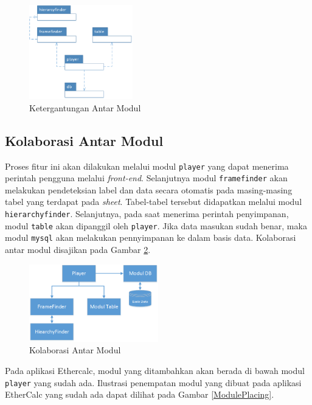 \begin{figure}[htb]
	\centering
	\includegraphics[width=0.4\textwidth]{resources/chapter-4-module-dependecy.png}
	\caption{Ketergantungan Antar Modul}
	\label{ModuleDependency}
\end{figure}

\subsection{Kolaborasi Antar Modul}
Proses fitur ini akan dilakukan melalui modul \texttt{player} yang dapat menerima perintah pengguna melalui \textit{front-end}. Selanjutnya modul \texttt{framefinder} akan melakukan pendeteksian label dan data secara otomatis pada masing-masing tabel yang terdapat pada \textit{sheet}. Tabel-tabel tersebut didapatkan melalui modul \texttt{hierarchyfinder}. Selanjutnya, pada saat menerima perintah penyimpanan, modul \texttt{table} akan dipanggil oleh \texttt{player}. Jika data masukan sudah benar, maka modul \texttt{mysql} akan melakukan pennyimpanan ke dalam basis data. Kolaborasi antar modul disajikan pada Gambar \ref{ModuleFlow}.

\begin{figure}[htb]
	\centering
	\includegraphics[width=0.5\textwidth]{resources/chapter-4-module-flow.png}
	\caption{Kolaborasi Antar Modul}
	\label{ModuleFlow}
\end{figure}

Pada aplikasi Ethercalc, modul yang ditambahkan akan berada di bawah modul \texttt{player} yang sudah ada. Ilustrasi penempatan modul yang dibuat pada aplikasi EtherCalc yang sudah ada dapat dilihat pada Gambar \ref{ModulePlacing}.

